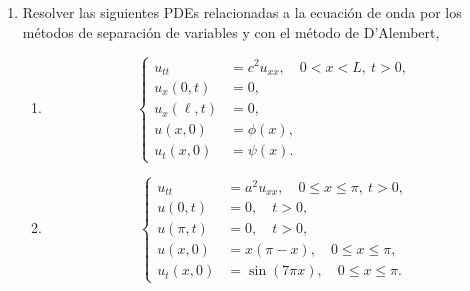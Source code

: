 \documentclass[12pt]{article}
\newcommand{\eej}{\hfill $\square$}
\newcommand{\N}{\mathbb{N}}
\newcommand{\pp}[1]{\left( #1 \right)}
\renewcommand{\a}{\alpha}
\begin{document}
\begin{enumerate}
\begin{enumerate}
\begin{align*}
                &\qquad-\frac{16}{\pi(9-2n)}\sin\pp{\tfrac{9-2n}{2}\pi}+\frac{16}{\pi(9+2n)}\sin\pp{\tfrac{9+2n}{2}\pi}\\
                &= \frac{4}{(2n-5)\pi}\sin\pp{\tfrac{2n-5}{2}\pi}-\frac{4}{(2n+5)\pi}\sin\pp{\tfrac{2n+5}{2}\pi}\\
                &\qquad-\frac{16}{(2n-9)\pi}\sin\pp{\tfrac{2n-9}{2}\pi}+\frac{16}{(2n+9)\pi}\sin\pp{\tfrac{2n+9}{2}\pi}\\
                &= \frac{4}{(2n-5)\pi}(-1)^{n+1}+\frac{4}{(2n+5)\pi}(-1)^{n+1}-\frac{16}{(2n-9)\pi}(-1)^{n+1}-\frac{16}{(2n+9)\pi}(-1)^{n+1}\\
                &= \frac{4}{\pi}(-1)^{n+1}\pp{\frac{1}{2n-5}+\frac{1}{2n+5}-\frac{4}{2n-9}-\frac{4}{2n+9}}\\
                &= \frac{4}{\pi}(-1)^{n+1}\pp{\frac{4n}{4n^2-5^2}-4\frac{4n}{4n^2-9^2}}\\
                &= \frac{16n}{\pi}(-1)^{n+1}\pp{\frac{1}{4n^2-5^2}-\frac{4}{4n^2-9^2}}\\
                &= \frac{16n}{\pi}(-1)^{n}\pp{\frac{12n^2-19}{(4n^2-5^2)(4n^2-9^2)}}\\
                &= (-1)^{n}\frac{16n(12n^2-19)}{\pi(4n^2-25)(4n^2-81)}.
            \end{align*}
            Por lo tanto,
            \[ u(x,t)=\sum_{n\in\N}(-1)^{n}\frac{16n(12n^2-19)}{\pi(4n^2-25)(4n^2-81)} \sin\pp{\frac{n\pi x}{L}}e^{-\pp{\frac{\a n\pi}{L}}^2t}.\]
            \eej
        \end{enumerate}
        

        \item Resolver las siguientes PDEs relacionadas a la ecuación de onda por los métodos de separación de variables y con el método de D’Alembert,

        \begin{enumerate}
            \item \[
            \begin{cases}
                u_{tt} &= c^2u_{xx},\quad 0<x<L,~t>0,\\
                u_x(0,t) &= 0,\\
                u_x(\ell, t) &= 0,\\
                u(x,0) &= \phi(x),\\
                u_t(x,0) &= \psi(x).
            \end{cases}
            \]

            \item \[
            \begin{cases}
                u_{tt} &= a^2u_{xx},\quad 0\leq x\leq \pi,~t>0,\\
                u(0,t) &= 0,\quad t>0,\\
                u(\pi, t) &= 0,\quad t>0,\\
                u(x,0) &= x(\pi-x),\quad 0\leq x\leq\pi,\\
                u_t(x,0) &= \sin(7\pi x),\quad 0\leq x\leq\pi.
            \end{cases}
            \]
        \end{enumerate}


\end{enumerate}
\end{document}

